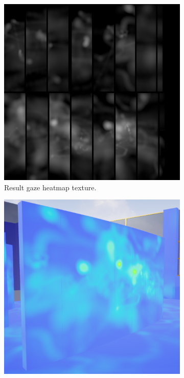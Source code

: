 \begin{figure}[!ht]\centering
    \begin{subfigure}[b]{0.32\textwidth}
        \centering
        \includegraphics[width=\textwidth]{img/data/Panel2/resultant/Result.png}
        \caption{Result gaze heatmap texture.}
    \end{subfigure}
    \hfill
    \begin{subfigure}[b]{0.32\textwidth}
        \centering
        \includegraphics[width=\textwidth]{img/data/Panel2/resultant/heatmap.png}

\end{subfigure}
\end{figure}

